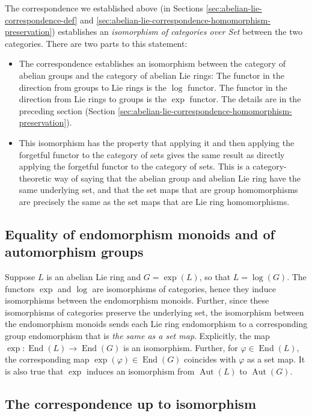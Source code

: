 \documentclass{ucetd}
\begin{document}
The correspondence we established above (in Sections
\ref{sec:abelian-lie-correspondence-def} and
\ref{sec:abelian-lie-correspondence-homomorphism-preservation})
establishes an {\em isomorphism of categories over Set} between the
two categories. There are two parts to this statement:

\begin{itemize}
\item The correspondence establishes an isomorphism between the
  category of abelian groups and the category of abelian Lie rings:
  The functor in the direction from groups to Lie rings is the $\log$
  functor. The functor in the direction from Lie rings to groups is
  the $\exp$ functor. The details are in the preceding section
  (Section
  \ref{sec:abelian-lie-correspondence-homomorphism-preservation}).
\item This isomorphism has the property that applying it and then
  applying the forgetful functor to the category of sets gives the
  same result as directly applying the forgetful functor to the
  category of sets. This is a category-theoretic way of saying that
  the abelian group and abelian Lie ring have the same underlying set,
  and that the set maps that are group homomorphisms are precisely the
  same as the set maps that are Lie ring homomorphisms.
\end{itemize}

\subsection{Equality of endomorphism monoids and of automorphism groups}\label{sec:abelian-lie-correspondence-aut-end}

Suppose $L$ is an abelian Lie ring and $G = \exp(L)$, so that $L =
\log(G)$. The functors $\exp$ and $\log$ are isomorphisms of
categories, hence they induce isomorphisms between the endomorphism
monoids. Further, since these isomorphisms of categories preserve the
underlying set, the isomorphism between the endomorphism monoids sends
each Lie ring endomorphism to a corresponding group endomorphism that
is {\em the same as a set map}. Explicitly, the map
$\exp:\operatorname{End}(L) \to \operatorname{End}(G)$ is an
isomorphism. Further, for $\varphi \in \operatorname{End}(L)$, the
corresponding map $\exp(\varphi) \in \operatorname{End}(G)$ coincides
with $\varphi$ as a set map. It is also true that $\exp$ induces an
isomorphism from $\operatorname{Aut}(L)$ to $\operatorname{Aut}(G)$.

\subsection{The correspondence up to isomorphism}\label{sec:abelian-lie-correspondence-up-to-isomorphism}
\end{document}
